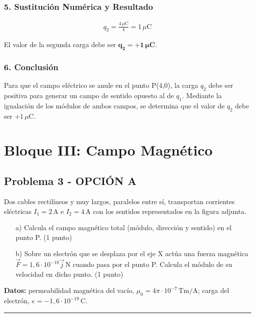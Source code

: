 \subsubsection*{5. Sustitución Numérica y Resultado}
\begin{gather}
    q_2 = \frac{4\,\mu\text{C}}{4} = 1\,\mu\text{C}
\end{gather}
\begin{cajaresultado}
El valor de la segunda carga debe ser $\boldsymbol{q_2 = +1\,\mu\textbf{C}}$.
\end{cajaresultado}
\subsubsection*{6. Conclusión}
\begin{cajaconclusion}
Para que el campo eléctrico se anule en el punto P(4,0), la carga $q_2$ debe ser positiva para generar un campo de sentido opuesto al de $q_1$. Mediante la igualación de los módulos de ambos campos, se determina que el valor de $q_2$ debe ser $+1\,\mu\text{C}$.
\end{cajaconclusion}
\newpage

\section{Bloque III: Campo Magnético}
\label{sec:mag_2019_jun_ord}

\subsection{Problema 3 - OPCIÓN A}
\label{subsec:3A_2019_jun_ord}
\begin{cajaenunciado}
Dos cables rectilíneos y muy largos, paralelos entre sí, transportan corrientes eléctricas $I_{1}=2\,\text{A}$ e $I_{2}=4\,\text{A}$ con los sentidos representados en la figura adjunta.
\begin{enumerate}
    \item[a)] Calcula el campo magnético total (módulo, dirección y sentido) en el punto P. (1 punto)
    \item[b)] Sobre un electrón que se desplaza por el eje X actúa una fuerza magnética $\vec{F}=1,6\cdot10^{-18}\vec{j}\,\text{N}$ cuando pasa por el punto P. Calcula el módulo de su velocidad en dicho punto. (1 punto)
\end{enumerate}
\textbf{Datos:} permeabilidad magnética del vacío, $\mu_{0}=4\pi\cdot10^{-7}\,\text{Tm/A}$; carga del electrón, $e=-1,6\cdot10^{-19}\,\text{C}$.
\end{cajaenunciado}
\hrule
